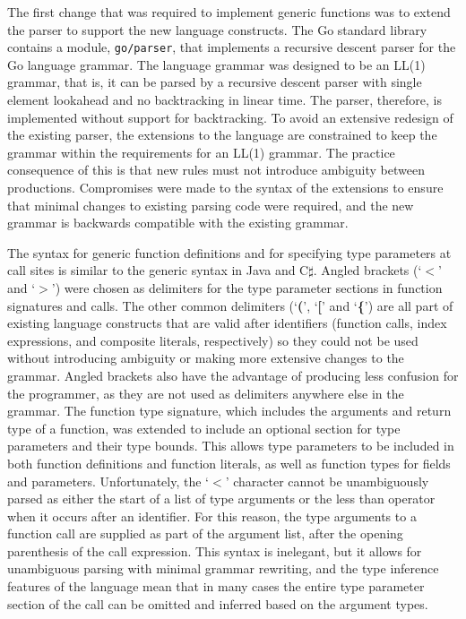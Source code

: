 \documentclass[letterpaper,twocolumn,10pt]{article}
\begin{document}
The first change that was required to implement generic functions was to extend the parser to support the new language constructs. The Go standard library contains a module, \texttt{go/parser}, that implements a recursive descent parser for the Go language grammar. The language grammar was designed to be an LL(1) grammar, that is, it can be parsed by a recursive descent parser with single element lookahead and no backtracking in linear time. The parser, therefore, is implemented without support for backtracking. To avoid an extensive redesign of the existing parser, the extensions to the language are constrained to keep the grammar within the requirements for an LL(1) grammar. The practice consequence of this is that new rules must not introduce ambiguity between productions. Compromises were made to the syntax of the extensions to ensure that minimal changes to existing parsing code were required, and the new grammar is backwards compatible with the existing grammar.

The syntax for generic function definitions and for specifying type parameters at call sites is similar to the generic syntax in Java and C$\sharp$. Angled brackets (`\textbf{$<$}' and `\textbf{$>$}') were chosen as delimiters for the type parameter sections in function signatures and calls. The other common delimiters (`\textbf{(}', `\textbf{[}' and `\textbf{\{}') are all part of existing language constructs that are valid after identifiers (function calls, index expressions, and composite literals, respectively) so they could not be used without introducing ambiguity or making more extensive changes to the grammar. Angled brackets also have the advantage of producing less confusion for the programmer, as they are not used as delimiters anywhere else in the grammar. The function type signature, which includes the arguments and return type of a function, was extended to include an optional section for type parameters and their type bounds. This allows type parameters to be included in both function definitions and function literals, as well as function types for fields and parameters. Unfortunately, the `\textbf{$<$}' character cannot be unambiguously parsed as either the start of a list of type arguments or the less than operator when it occurs after an identifier. For this reason, the type arguments to a function call are supplied as part of the argument list, after the opening parenthesis of the call expression. This syntax is inelegant, but it allows for unambiguous parsing with minimal grammar rewriting, and the type inference features of the language mean that in many cases the entire type parameter section of the call can be omitted and inferred based on the argument types.
\end{document}

